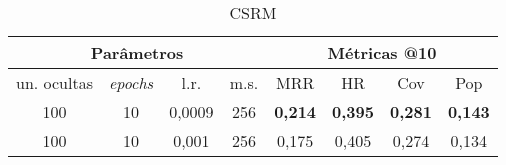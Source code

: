 \begin{table}[htbp]
  \centering
  \begin{tabular}{|c|c|c|c|c|c|c|c|}
    \hline
      \multicolumn{4}{|c|}{Parâmetros} & \multicolumn{4}{c|}{Métricas @10} \\
      \hline
      un. ocultas & \textit{epochs} & l.r. & m.s. & MRR & HR & Cov & Pop \\
      \hline
      100 & 10 & 0,0009 & 256 & \textbf{0,214} & \textbf{0,395} & \textbf{0,281} & \textbf{0,143} \\
      \hline
      100 & 10 & 0,001 & 256 & 0,175 & 0,405 & 0,274 & 0,134 \\
      \hline


\end{tabular}
      \caption{CSRM}
      \label{opt:csrm_last}
\end{table}
